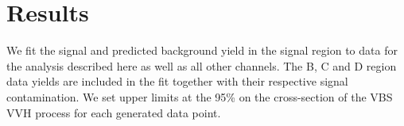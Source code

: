\begin{table}[htbp]
    \centering
    \caption[VBS $\VVH$ ABCD cross-check yields]{
        Data yields and signal-like region prediction for the ABCD closure tests. 
        Regions B$_i$, C$_i$, and D$_i$ are described in Fig.~\ref{fig:vbsvvh_abcd_extra}.
    }

    \label{tab:vbsvvh_closureTests}
\end{table}

\section{Results}
We fit the signal and predicted background yield in the signal region to data for the analysis described here as well as all other channels.
The B, C and D region data yields are included in the fit together with their respective signal contamination.
We set upper limits at the 95\% \CL on the cross-section of the VBS VVH process for each \kVV generated data point.

